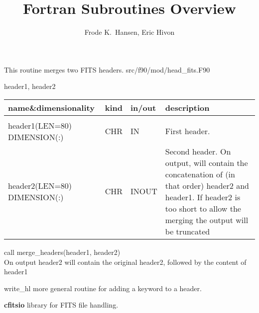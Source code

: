 
\sloppy

\title{\healpix Fortran Subroutines Overview}
 \section[merge\_headers]{ }
\label{sub:merge_headers}
\author{Frode K.~Hansen, Eric Hivon}

\begin{facility}
{This routine merges two FITS headers.}
{src/f90/mod/head\_fits.F90}
\end{facility}

\begin{f90format}
{header1, header2}
\end{f90format}

\begin{arguments}
{
\begin{tabular}{p{0.4\hsize} p{0.05\hsize} p{0.1\hsize} p{0.35\hsize}} \hline  
\textbf{name\&dimensionality} & \textbf{kind} & \textbf{in/out} & \textbf{description} \\ \hline
                   &   &   &                           \\ %
header1(LEN=80) DIMENSION(:) & CHR & IN & First header. \\
header2(LEN=80) DIMENSION(:) & CHR & INOUT & Second header. On output,
                   will contain the concatenation of (in that order) header2 and
                   header1. If header2 is too short to allow the
                   merging the output will be truncated\\
\end{tabular}
}
\end{arguments}

\begin{example}
{
call merge\_headers(header1, header2)  \\
}
{
On output header2 will contain the original header2, followed by the
content of header1
}
\end{example}

\begin{modules}
  \begin{sulist}{} %
  \item[write\_hl] more general routine for adding a keyword to a header.
  \item[\textbf{cfitsio}] library for FITS file handling.		
  \end{sulist}
\end{modules}

